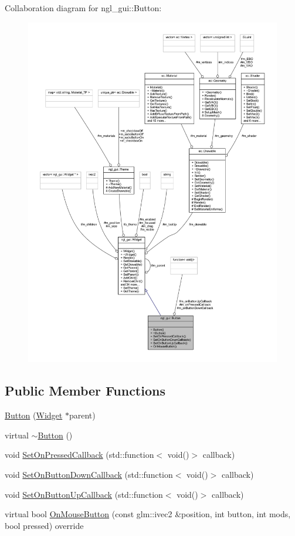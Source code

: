 Collaboration diagram for ngl\+\_\+gui\+:\+:Button\+:
\nopagebreak
\begin{figure}[H]
\begin{center}
\leavevmode
\includegraphics[width=350pt]{classngl__gui_1_1_button__coll__graph}
\end{center}
\end{figure}
\subsection*{Public Member Functions}
\begin{DoxyCompactItemize}
\item 
\mbox{\hyperlink{classngl__gui_1_1_button_ac153b6ad7d4656c9a66699fe91fb0529}{Button}} (\mbox{\hyperlink{classngl__gui_1_1_widget}{Widget}} $\ast$parent)
\item 
virtual \mbox{\hyperlink{classngl__gui_1_1_button_ae33e1e09f1f50ddc5f5820dbc90ff43f}{$\sim$\+Button}} ()
\item 
void \mbox{\hyperlink{classngl__gui_1_1_button_a604ffbd593690a3f4e044b357f678fdb}{Set\+On\+Pressed\+Callback}} (std\+::function$<$ void()$>$ callback)
\item 
void \mbox{\hyperlink{classngl__gui_1_1_button_a739337d2d66c43de5c0c6a7d0bc3552b}{Set\+On\+Button\+Down\+Callback}} (std\+::function$<$ void()$>$ callback)
\item 
void \mbox{\hyperlink{classngl__gui_1_1_button_ab1b47991bb39a0d905235fb185c3dd0a}{Set\+On\+Button\+Up\+Callback}} (std\+::function$<$ void()$>$ callback)
\item 
virtual bool \mbox{\hyperlink{classngl__gui_1_1_button_a1022c031cb9bb6658d8a6bb22295508d}{On\+Mouse\+Button}} (const glm\+::ivec2 \&position, int button, int mods, bool pressed) override
\end{DoxyCompactItemize}
